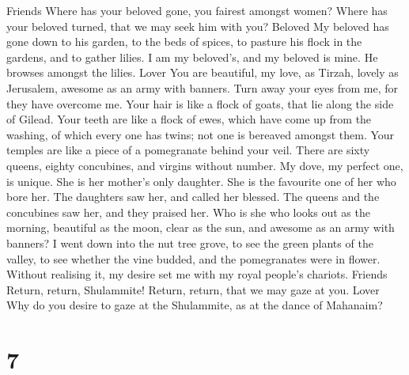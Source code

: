 Friends  Where has your beloved gone, you fairest amongst
women? Where has your beloved turned, that we may seek him with you?
Beloved  My beloved has gone down to his garden, to the beds
of spices, to pasture his flock in the gardens, and to gather lilies.
 I am my beloved's, and my beloved is mine. He browses
amongst the lilies. Lover  You are beautiful, my love, as
Tirzah, lovely as Jerusalem, awesome as an army with banners.
 Turn away your eyes from me, for they have overcome me.
Your hair is like a flock of goats, that lie along the side of Gilead.
 Your teeth are like a flock of ewes, which have come up
from the washing, of which every one has twins; not one is bereaved
amongst them.  Your temples are like a piece of a
pomegranate behind your veil.  There are sixty queens,
eighty concubines, and virgins without number.  My dove, my
perfect one, is unique. She is her mother's only daughter. She is the
favourite one of her who bore her. The daughters saw her, and called her
blessed. The queens and the concubines saw her, and they praised her.
 Who is she who looks out as the morning, beautiful as the
moon, clear as the sun, and awesome as an army with banners?
 I went down into the nut tree grove, to see the green
plants of the valley, to see whether the vine budded, and the
pomegranates were in flower.  Without realising it, my
desire set me with my royal people's chariots. Friends 
Return, return, Shulammite! Return, return, that we may gaze at you.
Lover Why do you desire to gaze at the Shulammite, as at the dance of
Mahanaim?

\hypertarget{section-6}{%
\section{7}\label{section-6}}

